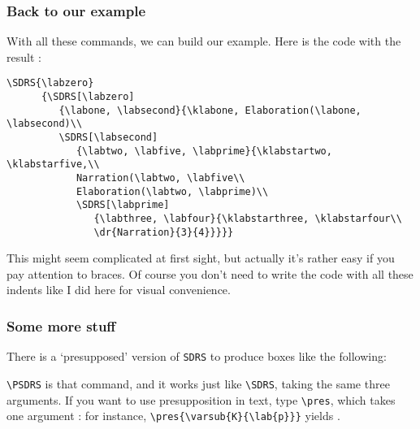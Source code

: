 \documentclass[a4paper]{article}
\begin{document}
\subsubsection{Back to our example}
With all these commands, we can build our example. Here is the code with the result :
\noindent
\begin{verbatim}
\SDRS{\labzero}
      {\SDRS[\labzero]
         {\labone, \labsecond}{\klabone, Elaboration(\labone, \labsecond)\\
         \SDRS[\labsecond]
            {\labtwo, \labfive, \labprime}{\klabstartwo, \klabstarfive,\\
            Narration(\labtwo, \labfive\\
            Elaboration(\labtwo, \labprime)\\
            \SDRS[\labprime]
               {\labthree, \labfour}{\klabstarthree, \klabstarfour\\
               \dr{Narration}{3}{4}}}}}
\end{verbatim}
\begin{center}
\end{center}
This might seem complicated at first sight, but actually it's rather easy if you pay attention to braces. Of course you don't need to write the code with all these indents like I did here for visual convenience. 

\subsubsection{Some more stuff}
There is a `presupposed' version of \verb+SDRS+ to produce boxes like the following:
\begin{center}
\end{center}
\verb+\PSDRS+ is that command, and it works just like \verb+\SDRS+, taking the same three arguments. If you want to use presupposition in text, type \verb+\pres+, which takes one argument : for instance, \verb+\pres{\varsub{K}{\lab{p}}}+ yields .
\end{document}
